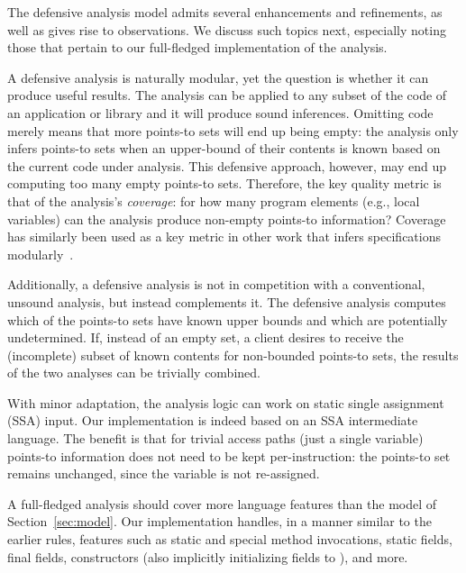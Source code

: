 The defensive analysis model admits several enhancements and
refinements, as well as gives rise to observations. We discuss such
topics next, especially noting those that pertain to our full-fledged
implementation of the analysis.

A defensive analysis is naturally modular, yet the question is whether
it can produce useful results. The analysis can be applied to any
subset of the code of an application or library and it will produce
sound inferences. Omitting code merely means that more points-to sets
will end up being empty: the analysis only infers points-to sets when
an upper-bound of their contents is known based on the current code
under analysis. This defensive approach, however, may end up computing
too many empty points-to sets. Therefore, the key quality metric is
that of the analysis's \emph{coverage}: for how many program elements
(e.g., local variables) can the analysis produce non-empty points-to
information? Coverage has similarly been used as a key metric in other
work that infers specifications
modularly~\cite{Calcagno:2009:CSA:1480881.1480917}.

Additionally, a defensive analysis is not in competition with a
conventional, unsound analysis, but instead complements it. The
defensive analysis computes which of the points-to sets have known
upper bounds and which are potentially undetermined. If, instead of an
empty set, a client desires to receive the (incomplete) subset of
known contents for non-bounded points-to sets, the results of the two
analyses can be trivially combined.

With minor adaptation, the analysis logic can work on static single
assignment (SSA) input. 
Our implementation is indeed based on an SSA intermediate
language. The benefit is that for trivial access paths (just a single
variable) points-to information does not need to be kept
per-instruction: the points-to set remains unchanged, since the
variable is not re-assigned.

A full-fledged analysis should cover more language features than the
model of Section~\ref{sec:model}. Our implementation handles, in a
manner similar to the earlier rules, features such as static and
special method invocations, static fields, final fields, constructors (also
implicitly initializing fields to ), and more.



